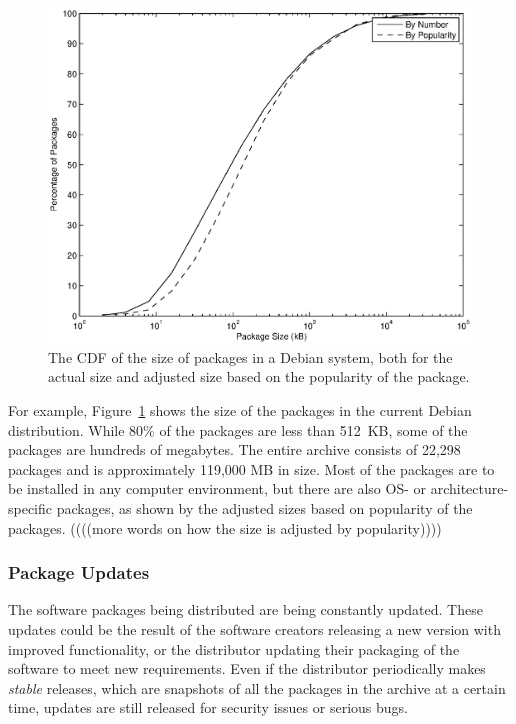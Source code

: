 \documentclass[conference]{IEEEtran}
\begin{document}
\begin{figure}
\centering
\includegraphics[width=\columnwidth]{apt_p2p_simulation-size_CDF.eps}
\caption{The CDF of the size of packages in a Debian system, both
for the actual size and adjusted size based on the popularity of
the package.}
\label{size_CDF}
\end{figure}

For example, Figure~\ref{size_CDF} shows the size of the packages in the
current Debian distribution. While 80\% of the packages are less than
512~KB, some of the packages are hundreds of megabytes. The entire
archive consists of 22,298 packages and is approximately 119,000 MB
in size. Most of the packages are to be installed in any computer environment, but there are 
also OS- or architecture-specific packages, as shown by the adjusted sizes based on popularity of the packages. ((((more words on how the size is adjusted by popularity))))

\subsubsection{Package Updates}

The software packages being distributed are being constantly
updated. These updates could be the result of the software creators
releasing a new version with improved functionality,
or the distributor updating their packaging of the
software to meet new requirements. Even if the distributor
periodically makes \emph{stable} releases, which are snapshots of
all the packages in the archive at a certain time, updates are still
released for security issues or serious bugs.
\end{document}
